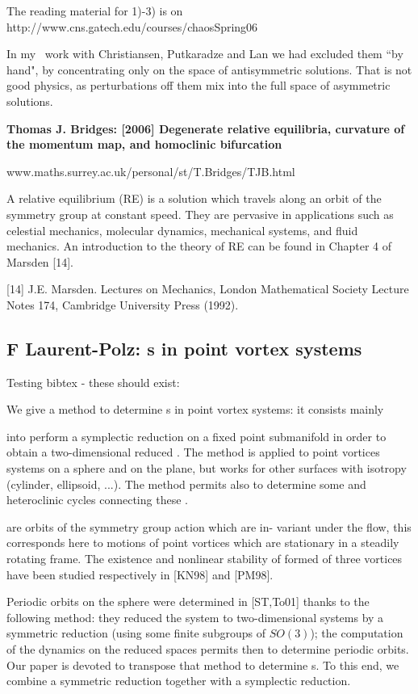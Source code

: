 The reading material for 1)-3) is on
http://www.cns.gatech.edu/courses/chaosSpring06

In my \KS\ work with Christiansen, Putkaradze and Lan we
had excluded them ``by hand", by concentrating only on the space of
antisymmetric solutions. That is not good physics, as perturbations off
them mix into the full space of asymmetric solutions.

{\bf Thomas J. Bridges: [2006]  Degenerate relative equilibria,
           curvature of the momentum map, and homoclinic bifurcation}

www.maths.surrey.ac.uk/personal/st/T.Bridges/TJB.html

A relative equilibrium (RE) is a solution which travels along an orbit of the symmetry group
at constant speed. They are pervasive in applications such as celestial mechanics, molecular
dynamics, mechanical systems, and fluid mechanics. An introduction to the theory of RE can
be found in Chapter 4 of Marsden [14].

[14] J.E. Marsden. Lectures on Mechanics, London Mathematical Society Lecture Notes 174,
Cambridge University Press (1992).




\subsection{F Laurent-Polz: {\Rpo s} in point vortex systems}

Testing bibtex - these should exist:

We give a method to determine {\rpo s} in point vortex systems: it consists mainly

into perform a symplectic reduction on a fixed point submanifold in order to obtain
a two-dimensional reduced \statesp. The method is applied to point vortices systems
on a sphere and on the plane, but works for other surfaces with isotropy
(cylinder, ellipsoid, ...). The method permits also to determine some
{\reqva} and heteroclinic cycles connecting these {\reqva}.

    {\Reqva} are orbits of the symmetry group action which are in-
variant under the flow, this corresponds here to motions of point vortices which
are stationary in a steadily rotating frame.
 The existence and nonlinear stability
of {\reqva} formed of three vortices have been studied respectively in
[KN98] and [PM98].

Periodic orbits on the sphere were determined in [ST,To01] thanks to the
following method: they reduced the system to two-dimensional systems by a
symmetric reduction (using some finite subgroups of $SO(3)$); the computation
of the dynamics on the reduced spaces permits then to determine periodic orbits.
Our paper is devoted to transpose that method to determine {\rpo s}.
To this end, we combine a symmetric reduction together with a symplectic reduction.

